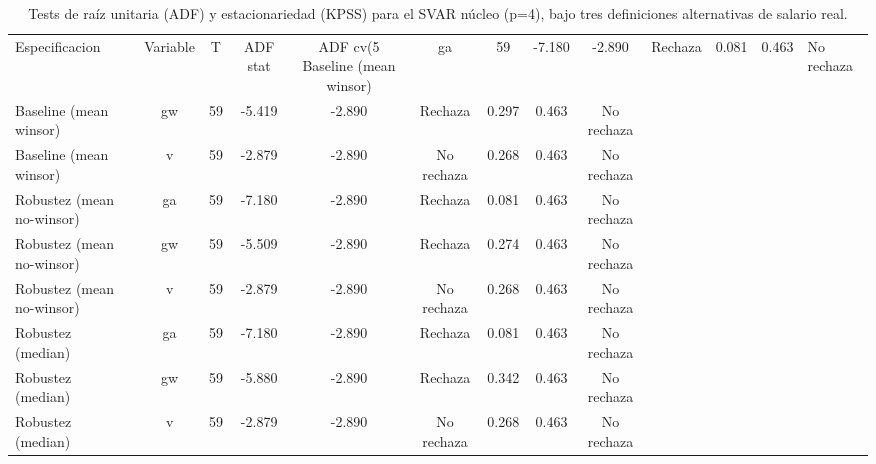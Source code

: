 \begin{table}[htbp]
\centering
\caption{Tests de raíz unitaria (ADF) y estacionariedad (KPSS) para el SVAR núcleo (p=4), bajo tres definiciones alternativas de salario real.}
\label{tab:unitroot_p4_all_specs}
\footnotesize
\begin{tabular}{lcccccccc}
\toprule
Especificacion & Variable & T & ADF stat & ADF cv(5%
\midrule
Baseline (mean winsor) & ga & 59 & -7.180 & -2.890 & Rechaza & 0.081 & 0.463 & No rechaza \\
Baseline (mean winsor) & gw & 59 & -5.419 & -2.890 & Rechaza & 0.297 & 0.463 & No rechaza \\
Baseline (mean winsor) & v & 59 & -2.879 & -2.890 & No rechaza & 0.268 & 0.463 & No rechaza \\
Robustez (mean no-winsor) & ga & 59 & -7.180 & -2.890 & Rechaza & 0.081 & 0.463 & No rechaza \\
Robustez (mean no-winsor) & gw & 59 & -5.509 & -2.890 & Rechaza & 0.274 & 0.463 & No rechaza \\
Robustez (mean no-winsor) & v & 59 & -2.879 & -2.890 & No rechaza & 0.268 & 0.463 & No rechaza \\
Robustez (median) & ga & 59 & -7.180 & -2.890 & Rechaza & 0.081 & 0.463 & No rechaza \\
Robustez (median) & gw & 59 & -5.880 & -2.890 & Rechaza & 0.342 & 0.463 & No rechaza \\
Robustez (median) & v & 59 & -2.879 & -2.890 & No rechaza & 0.268 & 0.463 & No rechaza \\
\bottomrule
\end{tabular}
\end{table}

